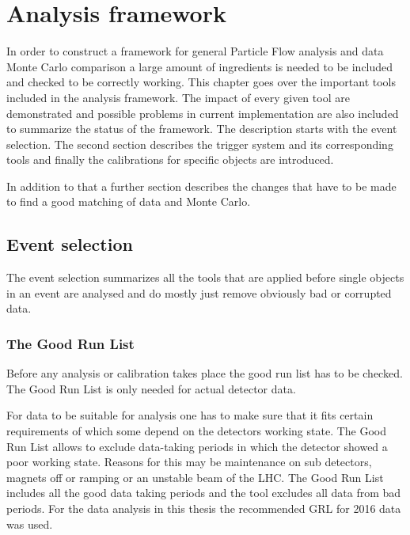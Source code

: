 \chapter{Analysis framework}

In order to construct a framework for general Particle Flow analysis and data Monte Carlo comparison a large amount of ingredients is needed to be included and checked to be correctly working. This chapter goes over the important tools included in the analysis framework. The impact of every given tool are demonstrated and possible problems in current implementation are also included to summarize the status of the framework.
The description starts with the event selection. The second section describes the trigger system and its corresponding tools and finally the calibrations for specific objects are introduced.

In addition to that a further section describes the changes that have to be made to find a good matching of data and Monte Carlo.




\section{Event selection}

The event selection summarizes all the tools that are applied before single objects in an event are analysed and do mostly just remove obviously bad or corrupted data.

\subsection{The Good Run List}

Before any analysis or calibration takes place the good run list has to be checked. The Good Run List is only needed for actual detector data.

For data to be suitable for analysis one has to make sure that it fits certain requirements of which some depend on the detectors working state. The Good Run List allows to exclude data-taking periods in which the detector showed a poor working state. Reasons for this may be maintenance on sub detectors, magnets off or ramping or an unstable beam of the LHC.
The Good Run List includes all the good data taking periods and the tool excludes all data from bad periods.
For the data analysis in this thesis the recommended GRL for 2016 data was used.

